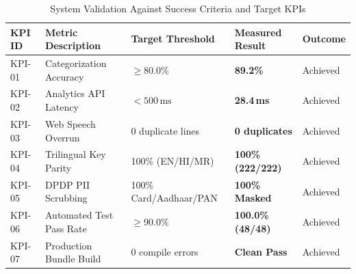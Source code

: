 \begin{table}[h]
\centering
\caption{System Validation Against Success Criteria and Target KPIs}
\label{tab:kpi_validation}
\begin{tabular}{|p{2.2cm}|p{4.2cm}|p{3.2cm}|p{3.2cm}|p{1.8cm}|}
\hline
\textbf{KPI ID} & \textbf{Metric Description} & \textbf{Target Threshold} & \textbf{Measured Result} & \textbf{Outcome} \\ \hline
KPI-01 & Categorization Accuracy & $\ge 80.0\%$ & \textbf{89.2\%} & Achieved \\ \hline
KPI-02 & Analytics API Latency & $< 500\,\text{ms}$ & \textbf{28.4\,ms} & Achieved \\ \hline
KPI-03 & Web Speech Overrun & 0 duplicate lines & \textbf{0 duplicates} & Achieved \\ \hline
KPI-04 & Trilingual Key Parity & 100\% (EN/HI/MR) & \textbf{100\% (222/222)} & Achieved \\ \hline
KPI-05 & DPDP PII Scrubbing & 100\% Card/Aadhaar/PAN & \textbf{100\% Masked} & Achieved \\ \hline
KPI-06 & Automated Test Pass Rate & $\ge 90.0\%$ & \textbf{100.0\% (48/48)} & Achieved \\ \hline
KPI-07 & Production Bundle Build & 0 compile errors & \textbf{Clean Pass} & Achieved \\ \hline
\end{tabular}
\end{table}
